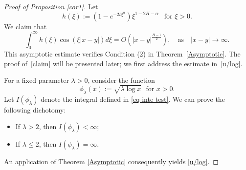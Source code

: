 \documentclass[11pt,reqno]{amsart}
\numberwithin{equation}{section}
\newcommand{\1}{{\bf 1}}
\newcommand{\2}{{\bf 2}}
\begin{document}
\begin{proof}[Proof of Proposition \ref{cor1}]
Let
\begin{equation*}
h(\xi) := \left(1 - e^{-2t\xi^\alpha}\right)\xi^{1-2H-\alpha}\ \ \text{ for } \xi>0.
\end{equation*}
We  claim that
\begin{equation}\label{claim}
\int_0^\infty h(\xi) \cos\left(\xi|x-y|\right) d\xi = O\left(|x-y|^{\frac{H-1}{2}}\right), \quad \text{as} \quad |x-y|\to\infty.
\end{equation}
This asymptotic estimate verifies Condition (2) in Theorem~\ref{Asymptotic}. The proof of~\eqref{claim} will be presented  later; we first address the estimate in~\eqref{u/log}.

For a fixed parameter $\lambda > 0$, consider the function
\[
\phi_{\lambda}(x) := \sqrt{\lambda\log x}\ \ \ \text{for } x>0.
\] 
Let $I(\phi_{\lambda})$ denote the integral defined in \eqref{eq inte test}. We can prove the following dichotomy:
\begin{itemize}
\item If $\lambda > 2$, then $I(\phi_{\lambda}) < \infty$;
\item If $\lambda \leq 2$, then $I(\phi_{\lambda}) = \infty$.
\end{itemize}
An application of Theorem \ref{Asymptotic} consequently yields \eqref{u/log}.




\end{proof}
\end{document}
